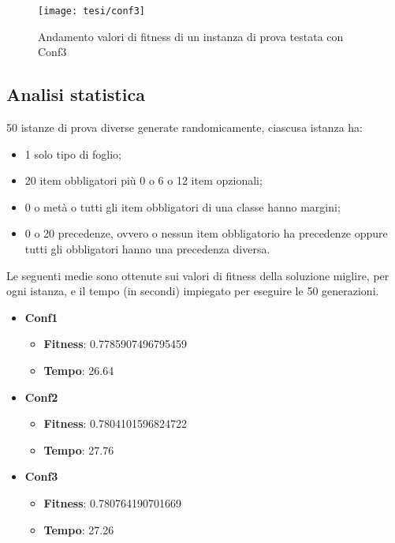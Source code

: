 \begin{figure}[!ht] 
    \centering 
    \texttt{[image: tesi/conf3]} 
    \caption{Andamento valori di fitness di un instanza di prova testata con Conf3}
\end{figure}

\subsection{Analisi statistica}

50 istanze di prova diverse generate randomicamente, ciascusa istanza ha:
\begin{itemize}
	\item 1 solo tipo di foglio;
	\item 20 item obbligatori più 0 o 6 o 12 item opzionali;
	\item 0 o metà o tutti gli item obbligatori di una classe hanno margini;
	\item 0 o 20 precedenze, ovvero o nessun item obbligatorio ha precedenze oppure tutti gli obbligatori hanno una precedenza diversa.
\end{itemize}

Le seguenti medie sono ottenute sui valori di fitness della soluzione miglire, per ogni istanza, e il tempo (in secondi) impiegato per eseguire le 50 generazioni.

\begin{itemize}
    \item \textbf{Conf1}
    \begin{itemize}
        \item\textbf{Fitness}: 0.7785907496795459
        \item\textbf{Tempo}: 26.64 
    \end{itemize}
    \item \textbf{Conf2}
    \begin{itemize}
        \item\textbf{Fitness}: 0.7804101596824722
        \item\textbf{Tempo}: 27.76
    \end{itemize}
    \item \textbf{Conf3}
    \begin{itemize}
        \item\textbf{Fitness}: 0.780764190701669
        \item\textbf{Tempo}: 27.26
    \end{itemize}
\end{itemize}

